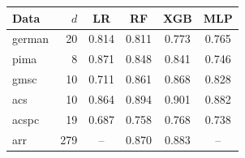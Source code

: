 \begin{tabular}{lrcccc}\toprule
Data & $d$ & LR & RF & XGB & MLP\\\midrule
german & 20 & 0.814 & 0.811 & 0.773 & 0.765\\
pima & 8 & 0.871 & 0.848 & 0.841 & 0.746\\
gmsc & 10 & 0.711 & 0.861 & 0.868 & 0.828\\
acs & 10 & 0.864 & 0.894 & 0.901 & 0.882\\
acspc & 19 & 0.687 & 0.758 & 0.768 & 0.738\\
arr & 279 & -- & 0.870 & 0.883 & --\\
\bottomrule\end{tabular}